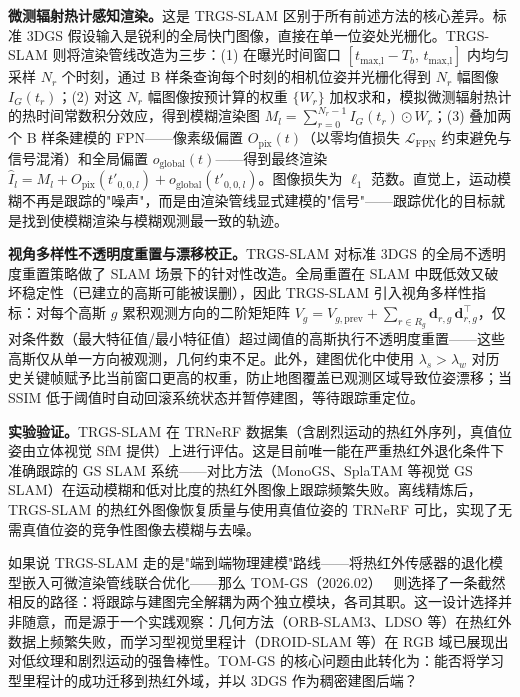 \textbf{微测辐射热计感知渲染。}这是 TRGS-SLAM 区别于所有前述方法的核心差异。标准 3DGS 假设输入是锐利的全局快门图像，直接在单一位姿处光栅化。TRGS-SLAM 则将渲染管线改造为三步：(1) 在曝光时间窗口 $[t_\text{max,l}-T_b,\, t_\text{max,l}]$ 内均匀采样 $N_r$ 个时刻，通过 B 样条查询每个时刻的相机位姿并光栅化得到 $N_r$ 幅图像 $I_G(t_r)$；(2) 对这 $N_r$ 幅图像按预计算的权重 $\{W_r\}$ 加权求和，模拟微测辐射热计的热时间常数积分效应，得到模糊渲染图 $M_l = \sum_{r=0}^{N_r-1} I_G(t_r) \odot W_r$；(3) 叠加两个 B 样条建模的 FPN——像素级偏置 $O_\text{pix}(t)$（以零均值损失 $\mathcal{L}_\text{FPN}$ 约束避免与信号混淆）和全局偏置 $o_\text{global}(t)$——得到最终渲染 $\hat{I}_l = M_l + O_\text{pix}(t'_{0,0,l}) + o_\text{global}(t'_{0,0,l})$。图像损失为 $\ell_1$ 范数。直觉上，运动模糊不再是跟踪的"噪声"，而是由渲染管线显式建模的"信号"——跟踪优化的目标就是找到使模糊渲染与模糊观测最一致的轨迹。

\textbf{视角多样性不透明度重置与漂移校正。}TRGS-SLAM 对标准 3DGS 的全局不透明度重置策略做了 SLAM 场景下的针对性改造。全局重置在 SLAM 中既低效又破坏稳定性（已建立的高斯可能被误删），因此 TRGS-SLAM 引入视角多样性指标：对每个高斯 $g$ 累积观测方向的二阶矩矩阵 $V_g = V_{g,\text{prev}} + \sum_{r \in R_g} \mathbf{d}_{r,g}\,\mathbf{d}_{r,g}^\top$，仅对条件数（最大特征值/最小特征值）超过阈值的高斯执行不透明度重置——这些高斯仅从单一方向被观测，几何约束不足。此外，建图优化中使用 $\lambda_s > \lambda_w$ 对历史关键帧赋予比当前窗口更高的权重，防止地图覆盖已观测区域导致位姿漂移；当 SSIM 低于阈值时自动回滚系统状态并暂停建图，等待跟踪重定位。

\textbf{实验验证。}TRGS-SLAM 在 TRNeRF 数据集（含剧烈运动的热红外序列，真值位姿由立体视觉 SfM 提供）上进行评估。这是目前唯一能在严重热红外退化条件下准确跟踪的 GS SLAM 系统——对比方法（MonoGS、SplaTAM 等视觉 GS SLAM）在运动模糊和低对比度的热红外图像上跟踪频繁失败。离线精炼后，TRGS-SLAM 的热红外图像恢复质量与使用真值位姿的 TRNeRF 可比，实现了无需真值位姿的竞争性图像去模糊与去噪。

如果说 TRGS-SLAM 走的是"端到端物理建模"路线——将热红外传感器的退化模型嵌入可微渲染管线联合优化——那么 TOM-GS（2026.02）~\cite{2602_07493} 则选择了一条截然相反的路径：将跟踪与建图完全解耦为两个独立模块，各司其职。这一设计选择并非随意，而是源于一个实践观察：几何方法（ORB-SLAM3、LDSO 等）在热红外数据上频繁失败，而学习型视觉里程计（DROID-SLAM 等）在 RGB 域已展现出对低纹理和剧烈运动的强鲁棒性。TOM-GS 的核心问题由此转化为：能否将学习型里程计的成功迁移到热红外域，并以 3DGS 作为稠密建图后端？

